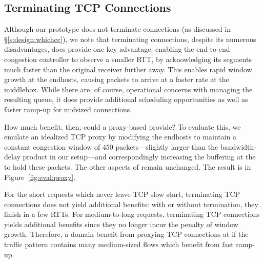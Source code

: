 
\subsection{Terminating TCP Connections}\label{s:eval:proxy}

Although our \name prototype does not terminate connections (as discussed in \S\ref{s:design:whichcc}), we note that terminating connections, despite its numerous disadvantages, does provide one key advantage: enabling the end-to-end congestion controller to observe a smaller RTT, by acknowledging its segments much faster than the original receiver further away. 
This enables rapid window growth at the endhosts, causing packets to arrive at a faster rate at the middlebox.
While there are, of course, operational concerns with managing the resulting queue, it does provide additional scheduling opportunities as well as faster ramp-up for midsized connections.

How much benefit, then, could a proxy-based \name provide?
To evaluate this, we emulate an idealized TCP proxy by modifying the endhosts to maintain a constant congestion window of $450$ packets---slightly larger than the bandwidth-delay product in our setup---and correspondingly increasing the buffering at the \inbox to hold these packets. 
The other aspects of \name remain unchanged.
The result is in Figure~\ref{fig:eval:proxy}. 

For the short requests which never leave TCP slow start, terminating TCP connections does not yield additional benefits: with or without termination, they finish in a few RTTs.
For medium-to-long requests, terminating TCP connections yields additional benefits since they no longer incur the penalty of window growth.
Therefore, a domain benefit from proxying TCP connections at \name if the traffic pattern contains many medium-sized flows which benefit from fast ramp-up.



